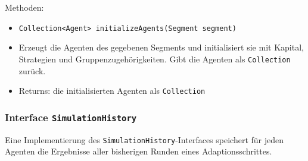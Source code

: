 \documentclass[parskip=full,11pt]{scrartcl}
\begin{document}
Methoden:
\begin{itemize}\itemsep -10pt
\item \texttt{Collection<Agent> initializeAgents(Segment segment)}
\item[] Erzeugt die Agenten des gegebenen Segments und initialisiert sie mit Kapital, Strategien und Gruppenzugehörigkeiten. Gibt die Agenten als \texttt{Collection} zurück.
\item[] Returns: die initialisierten Agenten als \texttt{Collection}
\end{itemize}

\subsubsection{Interface \texttt{SimulationHistory}}
Eine Implementierung des \texttt{SimulationHistory}-Interfaces speichert für jeden Agenten die Ergebnisse aller bisherigen Runden eines Adaptionsschrittes.
\end{document}

